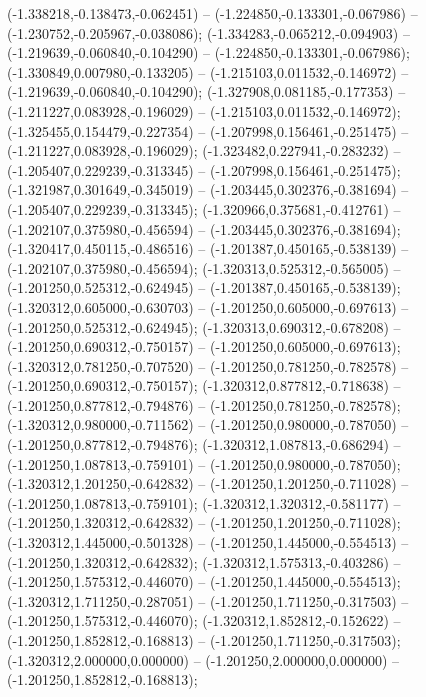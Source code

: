  (-1.338218,-0.138473,-0.062451) -- (-1.224850,-0.133301,-0.067986) -- (-1.230752,-0.205967,-0.038086);
 (-1.334283,-0.065212,-0.094903) -- (-1.219639,-0.060840,-0.104290) -- (-1.224850,-0.133301,-0.067986);
 (-1.330849,0.007980,-0.133205) -- (-1.215103,0.011532,-0.146972) -- (-1.219639,-0.060840,-0.104290);
 (-1.327908,0.081185,-0.177353) -- (-1.211227,0.083928,-0.196029) -- (-1.215103,0.011532,-0.146972);
 (-1.325455,0.154479,-0.227354) -- (-1.207998,0.156461,-0.251475) -- (-1.211227,0.083928,-0.196029);
 (-1.323482,0.227941,-0.283232) -- (-1.205407,0.229239,-0.313345) -- (-1.207998,0.156461,-0.251475);
 (-1.321987,0.301649,-0.345019) -- (-1.203445,0.302376,-0.381694) -- (-1.205407,0.229239,-0.313345);
 (-1.320966,0.375681,-0.412761) -- (-1.202107,0.375980,-0.456594) -- (-1.203445,0.302376,-0.381694);
 (-1.320417,0.450115,-0.486516) -- (-1.201387,0.450165,-0.538139) -- (-1.202107,0.375980,-0.456594);
 (-1.320313,0.525312,-0.565005) -- (-1.201250,0.525312,-0.624945) -- (-1.201387,0.450165,-0.538139);
 (-1.320312,0.605000,-0.630703) -- (-1.201250,0.605000,-0.697613) -- (-1.201250,0.525312,-0.624945);
 (-1.320313,0.690312,-0.678208) -- (-1.201250,0.690312,-0.750157) -- (-1.201250,0.605000,-0.697613);
 (-1.320312,0.781250,-0.707520) -- (-1.201250,0.781250,-0.782578) -- (-1.201250,0.690312,-0.750157);
 (-1.320312,0.877812,-0.718638) -- (-1.201250,0.877812,-0.794876) -- (-1.201250,0.781250,-0.782578);
 (-1.320312,0.980000,-0.711562) -- (-1.201250,0.980000,-0.787050) -- (-1.201250,0.877812,-0.794876);
 (-1.320312,1.087813,-0.686294) -- (-1.201250,1.087813,-0.759101) -- (-1.201250,0.980000,-0.787050);
 (-1.320312,1.201250,-0.642832) -- (-1.201250,1.201250,-0.711028) -- (-1.201250,1.087813,-0.759101);
 (-1.320312,1.320312,-0.581177) -- (-1.201250,1.320312,-0.642832) -- (-1.201250,1.201250,-0.711028);
 (-1.320312,1.445000,-0.501328) -- (-1.201250,1.445000,-0.554513) -- (-1.201250,1.320312,-0.642832);
 (-1.320312,1.575313,-0.403286) -- (-1.201250,1.575312,-0.446070) -- (-1.201250,1.445000,-0.554513);
 (-1.320312,1.711250,-0.287051) -- (-1.201250,1.711250,-0.317503) -- (-1.201250,1.575312,-0.446070);
 (-1.320312,1.852812,-0.152622) -- (-1.201250,1.852812,-0.168813) -- (-1.201250,1.711250,-0.317503);
 (-1.320312,2.000000,0.000000) -- (-1.201250,2.000000,0.000000) -- (-1.201250,1.852812,-0.168813);
